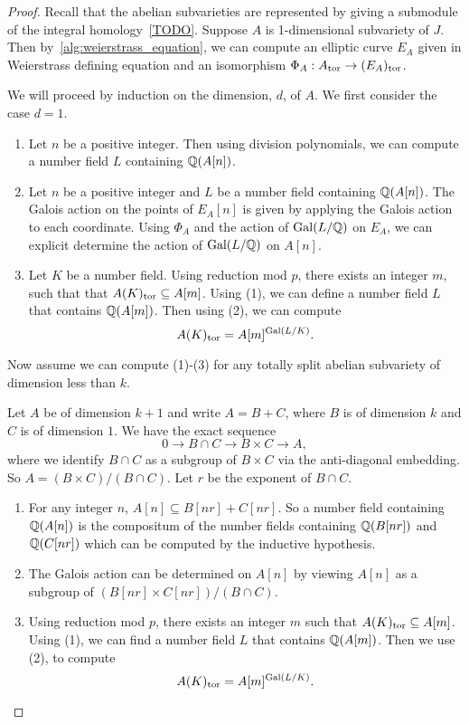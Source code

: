 \documentclass[11pt, proquest]{uwthesis}
\begin{document}
\begin{proof}
    Recall that the abelian subvarieties are represented by giving a submodule
    of the integral homology~\ref{TODO}. Suppose $A$ is 1-dimensional subvariety of
    $J$. Then by~\ref{alg:weierstrass_equation}, we can compute an elliptic
    curve $E_A$ given in Weierstrass defining equation and an isomorphism
    $\Phi_A:A_{\mathrm{tor}}\to (E_A)_{\mathrm{tor}}$.

    We will proceed by induction on the dimension, $d$, of $A$. We first
    consider the case $d=1$. 
    \begin{enumerate}
        \item 
            Let $n$ be a positive integer. Then using division polynomials, we
            can compute a number field $L$ containing $\mathbb{Q}(A[n])$.
        \item
            Let $n$ be a positive integer and $L$ be a number field containing
            $\mathbb{Q}(A[n])$. The Galois action on the points of $E_A[n]$ is given
            by applying the Galois action to each coordinate. Using $\Phi_A$
            and the action of $\operatorname{Gal}(L/\mathbb{Q})$ on $E_A$, we can explicit determine
            the action of $\operatorname{Gal}(L/\mathbb{Q})$ on $A[n]$.
        \item
            Let $K$ be a number field. Using reduction mod $p$, there exists an
            integer $m$, such that that $A(K)_{\mathrm{tor}} \subseteq A[m]$. Using (1),
            we can define a number field $L$ that contains $\mathbb{Q}(A[m])$. Then
            using (2), we can compute
            \[
                A(K)_{\mathrm{tor}} = A[m]^{\operatorname{Gal}(L/K)}.
            \]
    \end{enumerate}

    Now assume we can compute (1)-(3) for any totally split abelian subvariety
    of dimension less than $k$.

    Let $A$ be of dimension $k+1$ and write $A=B+C$, where $B$ is of
    dimension $k$ and $C$ is of dimension $1$.  We have the exact sequence
    \[
        0\to B\cap C \to B\times C \to A,
    \]
    where we identify $B\cap C$ as a subgroup of $B\times C$ via the
    anti-diagonal embedding. So $A=(B\times C)/(B\cap C)$. Let $r$ be the
    exponent of $B\cap C$. 
    \begin{enumerate}
        \item 
            For any integer $n$, $A[n] \subseteq B[nr]+C[nr]$. So a number
            field containing $\mathbb{Q}(A[n])$ is the compositum  of the number
            fields containing $\mathbb{Q}(B[nr])$ and $\mathbb{Q}(C[nr])$ which can be
            computed by the inductive hypothesis.
        \item
            The Galois action can be determined on $A[n]$ by viewing $A[n]$ as
            a subgroup of $(B[nr]\times C[nr])/(B\cap C)$.
        \item
            Using reduction mod $p$, there exists an integer $m$ such that
            $A(K)_{\mathrm{tor}}\subseteq A[m]$. Using (1), we can find a number field
            $L$ that contains $\mathbb{Q}(A[m])$. Then we use (2), to compute
            \[
                A(K)_{\mathrm{tor}} = A[m]^{\operatorname{Gal}(L/K)}.
            \]
    \end{enumerate}
\end{proof}
\end{document}
